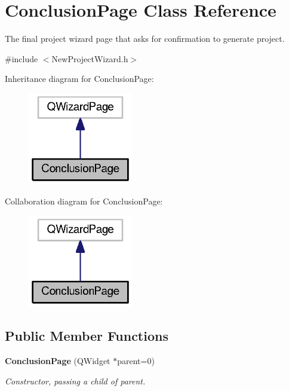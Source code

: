 \section{Conclusion\-Page Class Reference}
\label{class_conclusion_page}


The final project wizard page that asks for confirmation to generate project.  




{\ttfamily \#include $<$New\-Project\-Wizard.\-h$>$}



Inheritance diagram for Conclusion\-Page\-:\nopagebreak
\begin{figure}[H]
\begin{center}
\leavevmode
\includegraphics[width=130pt]{class_conclusion_page__inherit__graph}
\end{center}
\end{figure}


Collaboration diagram for Conclusion\-Page\-:\nopagebreak
\begin{figure}[H]
\begin{center}
\leavevmode
\includegraphics[width=130pt]{class_conclusion_page__coll__graph}
\end{center}
\end{figure}
\subsection*{Public Member Functions}
\begin{DoxyCompactItemize}
\item 
{\bf Conclusion\-Page} (Q\-Widget $\ast$parent=0)
\begin{DoxyCompactList}\small\item\em Constructor, passing a child of parent. \end{DoxyCompactList}\end{DoxyCompactItemize}
